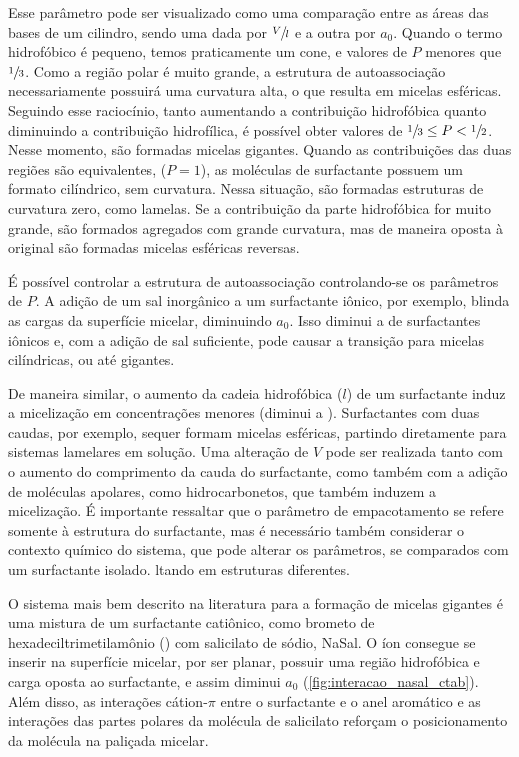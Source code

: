 	Esse parâmetro pode ser visualizado como uma comparação entre as áreas das bases de um cilindro, sendo uma dada por \(\sfrac{V}{l}\) e a outra por \(a_0\). Quando o termo hidrofóbico é pequeno, temos praticamente um cone, e valores de \(P\) menores que \(\sfrac{1}{3}\). Como a região polar é muito grande, a estrutura de autoassociação necessariamente possuirá uma curvatura alta, o que resulta em micelas esféricas. Seguindo esse raciocínio, tanto aumentando a contribuição hidrofóbica quanto diminuindo a contribuição hidrofílica, é possível obter valores de \(\sfrac{1}{3} \leq P < \sfrac{1}{2}\). Nesse momento, são formadas micelas gigantes. Quando as contribuições das duas regiões são equivalentes, (\(P = 1\)), as moléculas de surfactante possuem um formato cilíndrico, sem curvatura. Nessa situação, são formadas estruturas de curvatura zero, como lamelas. Se a contribuição da parte hidrofóbica for muito grande, são formados agregados com grande curvatura, mas de maneira oposta à original são formadas micelas esféricas reversas.
	
	
	É possível controlar a estrutura de autoassociação controlando-se os parâmetros de \(P\). A adição de um sal inorgânico a um surfactante iônico, por exemplo, blinda as cargas da superfície micelar, diminuindo \(a_0\). Isso diminui a \cmc{} de surfactantes iônicos e, com a adição de sal suficiente, pode causar a transição para micelas cilíndricas, ou até gigantes.
	
	De maneira similar, o aumento da cadeia hidrofóbica (\(l\)) de um surfactante induz a micelização em concentrações menores (diminui a \cmc). Surfactantes com duas caudas, por exemplo, sequer formam micelas esféricas, partindo diretamente para sistemas lamelares em solução. Uma alteração de \(V\) pode ser realizada tanto com o aumento do comprimento da cauda do surfactante, como também com a adição de moléculas apolares, como hidrocarbonetos, que também induzem a micelização. É importante ressaltar que o parâmetro de empacotamento se refere somente à estrutura do surfactante, mas é necessário também considerar o contexto químico do sistema, que pode alterar os parâmetros, se comparados com um surfactante isolado.
	ltando em estruturas diferentes. 
	
	O sistema mais bem descrito na literatura para a formação de micelas gigantes é uma mistura de um surfactante catiônico, como brometo de hexadeciltrimetilamônio (\CTAB) com salicilato de sódio, NaSal. O íon \Sal{} consegue se inserir na superfície micelar, por ser planar, possuir uma região hidrofóbica e carga oposta ao surfactante, e assim diminui \(a_0\) (\ref{fig:interacao_nasal_ctab}). Além disso, as interações cátion-\(\pi\) entre o surfactante e o anel aromático e as interações das partes polares da molécula de salicilato reforçam o posicionamento da molécula na paliçada micelar.
	
